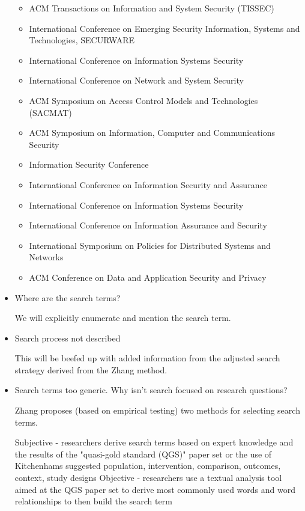 \begin{itemize}
  \begin{itemize}
    \item ACM Transactions on Information and System Security (TISSEC)
    \item International Conference on Emerging Security Information, Systems and Technologies, SECURWARE
    \item International Conference on Information Systems Security
    \item International Conference on Network and System Security
    \item ACM Symposium on Access Control Models and Technologies (SACMAT)
    \item ACM Symposium on Information, Computer and Communications Security
    \item Information Security Conference
    \item International Conference on Information Security and Assurance
    \item International Conference on Information Systems Security
    \item International Conference on Information Assurance and Security
    \item International Symposium on Policies for Distributed Systems and Networks
    \item ACM Conference on Data and Application Security and Privacy
  \end{itemize}

\item Where are the search terms?

We will explicitly enumerate and mention the search term.

\item Search process not described

This will be beefed up with added information from the adjusted search strategy derived from the Zhang method.

\item Search terms too generic. Why isn't search focused on research questions?

Zhang \cite{zhang2011identifying} proposes (based on empirical testing) two methods for selecting search terms.

Subjective - researchers derive search terms based on expert knowledge and the results of the "quasi-gold standard (QGS)" paper set or the use of Kitchenhams suggested population, intervention, comparison, outcomes, context, study designs
Objective - researchers use a textual analysis tool aimed at the QGS paper set to derive most commonly used words and word relationships to then build the search term


\end{itemize}
